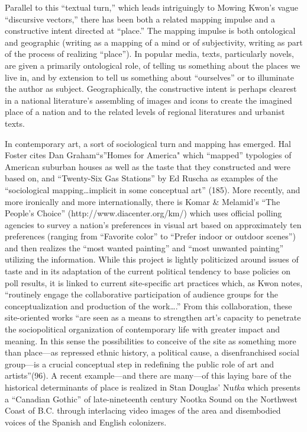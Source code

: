 \documentclass[
]{memoir}
\begin{document}
Parallel to this ``textual turn,'' which leads intriguingly to Mowing
Kwon's vague ``discursive vectors,'' there has been both a related
mapping impulse and a constructive intent directed at ``place.'' The
mapping impulse is both ontological and geographic (writing as a mapping
of a mind or of subjectivity, writing as part of the process of
realizing ``place''). In popular media, texts, particularly novels, are
given a primarily ontological role, of telling us something about the
places we live in, and by extension to tell us something about
``ourselves'' or to illuminate the author as subject. Geographically,
the constructive intent is perhaps clearest in a national literature's
assembling of images and icons to create the imagined place of a nation
and to the related levels of regional literatures and urbanist texts.

In contemporary art, a sort of sociological turn and mapping has
emerged. Hal Foster cites Dan Graham``s''Homes for America" which
``mapped'' typologies of American suburban houses as well as the taste
that they constructed and were based on, and ``Twenty-Six Gas Stations''
by Ed Ruscha as examples of the ``sociological mapping\ldots{}implicit
in some conceptual art'' (185). More recently, and more ironically and
more internationally, there is Komar \& Melamid's ``The People's
Choice'' ({http://www.diacenter.org/km/}) which uses official polling
agencies to survey a nation's preferences in visual art based on
approximately ten preferences (ranging from ``Favorite color'' to
``Prefer indoor or outdoor scenes'') and then realizes the ``most wanted
painting'' and ``most unwanted painting'' utilizing the information.
While this project is lightly politicized around issues of taste and in
its adaptation of the current political tendency to base policies on
poll results, it is linked to current site-specific art practices which,
as Kwon notes, ``routinely engage the collaborative participation of
audience groups for the conceptualization and production of the
work\ldots{}.'' From this collaboration, these site-oriented works ``are
seen as a means to strengthen art's capacity to penetrate the
sociopolitical organization of contemporary life with greater impact and
meaning. In this sense the possibilities to conceive of the site as
something more than place---as repressed ethnic history, a political
cause, a disenfranchised social group---is a crucial conceptual step in
redefining the public role of art and artists''(96). A recent
example---and there are many---of this laying bare of the historical
determinants of place is realized in Stan Douglas' Nu\emph{tka} which
presents a ``Canadian Gothic'' of late-nineteenth century Nootka Sound
on the Northwest Coast of B.C. through interlacing video images of the
area and disembodied voices of the Spanish and English colonizers.
\end{document}
